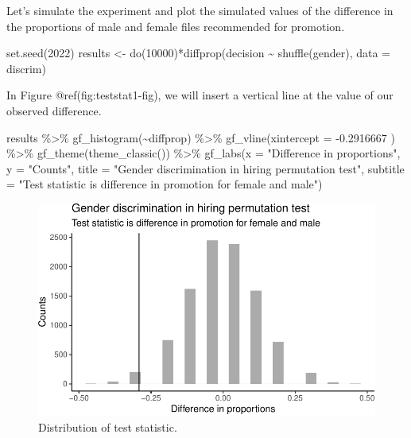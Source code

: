\documentclass[
  letterpaper,
  DIV=11,
  numbers=noendperiod]{scrreprt}
\newenvironment{Shaded}{\begin{snugshade}}{\end{snugshade}}
\newcommand{\AttributeTok}[1]{\textcolor[rgb]{0.40,0.45,0.13}{#1}}
\newcommand{\DecValTok}[1]{\textcolor[rgb]{0.68,0.00,0.00}{#1}}
\newcommand{\FloatTok}[1]{\textcolor[rgb]{0.68,0.00,0.00}{#1}}
\newcommand{\FunctionTok}[1]{\textcolor[rgb]{0.28,0.35,0.67}{#1}}
\newcommand{\NormalTok}[1]{\textcolor[rgb]{0.00,0.23,0.31}{#1}}
\newcommand{\OtherTok}[1]{\textcolor[rgb]{0.00,0.23,0.31}{#1}}
\newcommand{\SpecialCharTok}[1]{\textcolor[rgb]{0.37,0.37,0.37}{#1}}
\newcommand{\StringTok}[1]{\textcolor[rgb]{0.13,0.47,0.30}{#1}}
\begin{document}
Let's simulate the experiment and plot the simulated values of the
difference in the proportions of male and female files recommended for
promotion.

\begin{Shaded}
\begin{Highlighting}[]
\FunctionTok{set.seed}\NormalTok{(}\DecValTok{2022}\NormalTok{)}
\NormalTok{results }\OtherTok{\textless{}{-}} \FunctionTok{do}\NormalTok{(}\DecValTok{10000}\NormalTok{)}\SpecialCharTok{*}\FunctionTok{diffprop}\NormalTok{(decision }\SpecialCharTok{\textasciitilde{}} \FunctionTok{shuffle}\NormalTok{(gender), }\AttributeTok{data =}\NormalTok{ discrim)}
\end{Highlighting}
\end{Shaded}

In Figure @ref(fig:teststat1-fig), we will insert a vertical line at the
value of our observed difference.

\begin{Shaded}
\begin{Highlighting}[]
\NormalTok{results }\SpecialCharTok{\%\textgreater{}\%}
  \FunctionTok{gf\_histogram}\NormalTok{(}\SpecialCharTok{\textasciitilde{}}\NormalTok{diffprop) }\SpecialCharTok{\%\textgreater{}\%}
  \FunctionTok{gf\_vline}\NormalTok{(}\AttributeTok{xintercept =} \SpecialCharTok{{-}}\FloatTok{0.2916667}\NormalTok{ ) }\SpecialCharTok{\%\textgreater{}\%}
  \FunctionTok{gf\_theme}\NormalTok{(}\FunctionTok{theme\_classic}\NormalTok{()) }\SpecialCharTok{\%\textgreater{}\%}
  \FunctionTok{gf\_labs}\NormalTok{(}\AttributeTok{x =} \StringTok{"Difference in proportions"}\NormalTok{, }\AttributeTok{y =} \StringTok{"Counts"}\NormalTok{,}
          \AttributeTok{title =} \StringTok{"Gender discrimination in hiring permutation test"}\NormalTok{,}
          \AttributeTok{subtitle =} \StringTok{"Test statistic is difference in promotion for female and male"}\NormalTok{)}
\end{Highlighting}
\end{Shaded}

\begin{figure}[H]

{\centering \includegraphics{18-Inference-Case-Study_files/figure-pdf/teststat1-fig-1.pdf}

}

\caption{Distribution of test statistic.}

\end{figure}%
\end{document}
